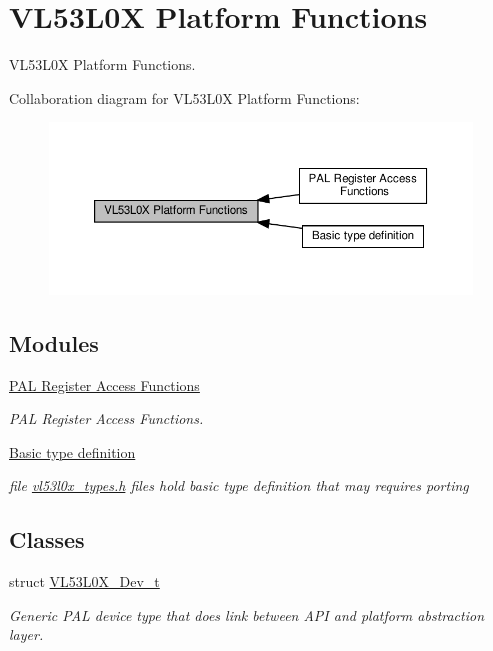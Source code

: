 \hypertarget{group__VL53L0X__platform__group}{}\section{V\+L53\+L0X Platform Functions}
\label{group__VL53L0X__platform__group}


V\+L53\+L0X Platform Functions.  


Collaboration diagram for V\+L53\+L0X Platform Functions\+:\nopagebreak
\begin{figure}[H]
\begin{center}
\leavevmode
\includegraphics[width=350pt]{group__VL53L0X__platform__group}
\end{center}
\end{figure}
\subsection*{Modules}
\begin{DoxyCompactItemize}
\item 
\hyperlink{group__VL53L0X__registerAccess__group}{P\+A\+L Register Access Functions}
\begin{DoxyCompactList}\small\item\em P\+AL Register Access Functions. \end{DoxyCompactList}\item 
\hyperlink{group__porting__type}{Basic type definition}
\begin{DoxyCompactList}\small\item\em file \hyperlink{vl53l0x__types_8h}{vl53l0x\+\_\+types.\+h} files hold basic type definition that may requires porting \end{DoxyCompactList}\end{DoxyCompactItemize}
\subsection*{Classes}
\begin{DoxyCompactItemize}
\item 
struct \hyperlink{structVL53L0X__Dev__t}{V\+L53\+L0\+X\+\_\+\+Dev\+\_\+t}
\begin{DoxyCompactList}\small\item\em Generic P\+AL device type that does link between A\+PI and platform abstraction layer. \end{DoxyCompactList}\end{DoxyCompactItemize}
